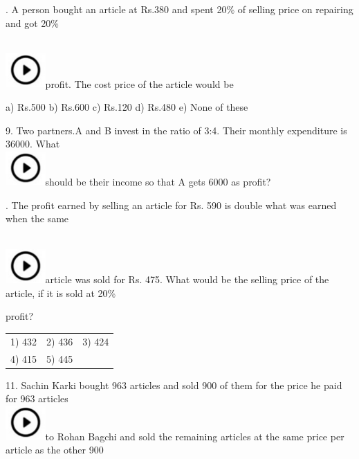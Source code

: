 \documentclass{article} %
\begin{document}
\noindent 

.   A person bought an article at Rs.380 and spent 20\% of selling price on repairing and got 20\%

\noindent  
\noindent \\ \includegraphics*[width=0.60in, height=0.52in]{images/image1}profit. The cost price of the article would be

\noindent a) Rs.500                b) Rs.600          c) Rs.120          d) Rs.480          e) None of these

\noindent 

\noindent 

9.   Two partners.A and B invest in the ratio of 3:4. Their monthly expenditure is 36000. What  
\noindent \\ \includegraphics*[width=0.60in, height=0.52in]{images/image1}should be their income so that A gets 6000 as profit?

. The profit earned by selling an article for Rs. 590 is double what was earned when the same

\noindent  
\noindent \\ \includegraphics*[width=0.60in, height=0.52in]{images/image1}article was sold for Rs. 475.  What would be the selling price of the article, if it is sold at 20\%

\noindent profit?

\noindent 

\noindent 
\begin{tabular}{p{1.7in} p{1.6in} p{1.6in}} \\ 
	1) 432                      &  2) 436               &  3) 424               \\
4) 415               & 5) 445 \\
\end{tabular}

\noindent 

11. Sachin Karki bought 963 articles and sold 900 of them for the     price he paid for 963 articles  
\noindent \\ \includegraphics*[width=0.60in, height=0.52in]{images/image1}to Rohan Bagchi and sold the remaining articles at the same price per article as the other 900
\end{document}
